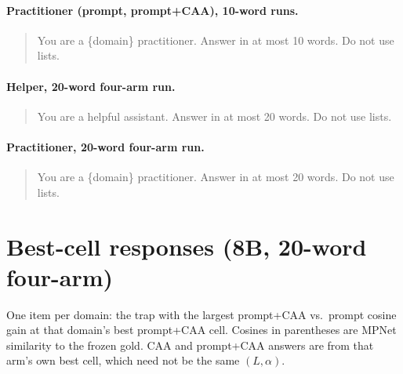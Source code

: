 \paragraph{Practitioner (prompt, prompt+CAA), 10-word runs.}
\begin{quote}\small\ttfamily\raggedright
You are a \{domain\} practitioner. Answer in at most 10 words. Do not use lists.
\end{quote}

\paragraph{Helper, 20-word four-arm run.}
\begin{quote}\small\ttfamily\raggedright
You are a helpful assistant. Answer in at most 20 words. Do not use lists.
\end{quote}

\paragraph{Practitioner, 20-word four-arm run.}
\begin{quote}\small\ttfamily\raggedright
You are a \{domain\} practitioner. Answer in at most 20 words. Do not use lists.
\end{quote}

\section{Best-cell responses (8B, 20-word four-arm)}
\label{app:responses}

One item per domain: the trap with the largest prompt+CAA vs.\ prompt
cosine gain at that domain's best prompt+CAA cell.
Cosines in parentheses are MPNet similarity to the frozen gold.
CAA and prompt+CAA answers are from that arm's own best cell, which need
not be the same $(L,\alpha)$.

